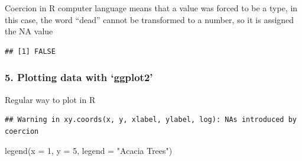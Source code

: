 \documentclass[
]{article}
\newenvironment{Shaded}{\begin{snugshade}}{\end{snugshade}}
\newcommand{\AttributeTok}[1]{\textcolor[rgb]{0.77,0.63,0.00}{#1}}
\newcommand{\DecValTok}[1]{\textcolor[rgb]{0.00,0.00,0.81}{#1}}
\newcommand{\FunctionTok}[1]{\textcolor[rgb]{0.00,0.00,0.00}{#1}}
\newcommand{\NormalTok}[1]{#1}
\newcommand{\OtherTok}[1]{\textcolor[rgb]{0.56,0.35,0.01}{#1}}
\newcommand{\SpecialCharTok}[1]{\textcolor[rgb]{0.00,0.00,0.00}{#1}}
\newcommand{\StringTok}[1]{\textcolor[rgb]{0.31,0.60,0.02}{#1}}
\begin{document}
Coercion in R computer language means that a value was forced to be a
type, in this case, the word ``dead'' cannot be transformed to a number,
so it is assigned the NA value

\begin{Shaded}
\end{Shaded}

\begin{verbatim}
## [1] FALSE
\end{verbatim}

\hypertarget{plotting-data-with-ggplot2}{%
\subsubsection{5. Plotting data with
`ggplot2'}\label{plotting-data-with-ggplot2}}

Regular way to plot in R

\begin{Shaded}
\end{Shaded}

\begin{verbatim}
## Warning in xy.coords(x, y, xlabel, ylabel, log): NAs introduced by coercion
\end{verbatim}

\begin{Shaded}
\begin{Highlighting}[]
\FunctionTok{legend}\NormalTok{(}\AttributeTok{x =} \DecValTok{1}\NormalTok{, }\AttributeTok{y =} \DecValTok{5}\NormalTok{, }\AttributeTok{legend =} \StringTok{"Acacia Trees"}\NormalTok{)}
\end{Highlighting}
\end{Shaded}
\end{document}
